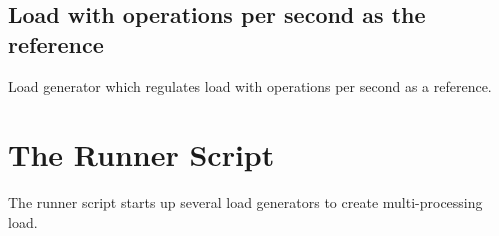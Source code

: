 \documentclass{article}
\begin{document}
\subsection{Load with operations per second as the reference}

Load generator which regulates load with operations per second as a
reference.

\section{The Runner Script}

The runner script starts up several load generators to create
multi-processing load.
\end{document}
